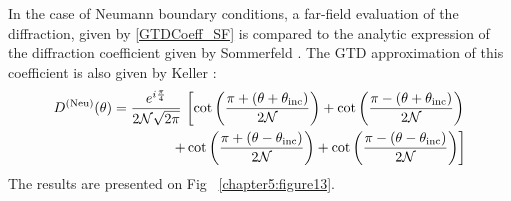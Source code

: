 In the case of Neumann boundary conditions, a far-field evaluation of the diffraction, given by \eqref{GTDCoeff_SF} is compared to the analytic expression of the diffraction coefficient given by Sommerfeld \cite{Sommerfeld}. The GTD approximation of this coefficient is also given by Keller \cite{GTD} :
\begin{align}
\label{GTDCoeff_Neu}
D^{\rm (Neu)}(\theta) = \dfrac{e^{i\frac{\pi}{4}}}{2\mathcal{N} \sqrt{2\pi}}  \, \left[ \cot \left( \dfrac{\pi + (\theta + \theta_{\rm inc})}{2\mathcal{N}} \right) + \cot \left( \dfrac{\pi - (\theta + \theta_{\rm inc})}{2\mathcal{N}} \right) \right.   \nonumber \\
\left. + \cot \left( \dfrac{\pi + (\theta - \theta_{\rm inc})}{2\mathcal{N}} \right) + \cot \left( \dfrac{\pi - (\theta - \theta_{\rm inc})}{2\mathcal{N}} \right) \right] 
\end{align}
The results are presented on Fig ~\ref{chapter5:figure13}.


